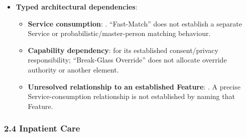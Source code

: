 \begin{itemize}
\begin{itemize}
\end{itemize}


\item 
\textbf{Typed architectural dependencies}:


\begin{itemize}

\item 
\textbf{Service consumption}: \texttt{}. “Fast-Match” does not establish a separate Service or probabilistic/\allowbreak{}master-person matching behaviour.



\item 
\textbf{Capability dependency}: \texttt{} for its established consent/\allowbreak{}privacy responsibility; “Break-Glass Override” does not allocate override authority or another element.



\item 
\textbf{Unresolved relationship to an established Feature}: \texttt{}. A precise Service-consumption relationship is not established by naming that Feature.



\end{itemize}


\end{itemize}
\label{rad:sd:105}

\par\smallskip
{}\label{rad:sd:107}



\label{rad:sd:109}
\subsubsection*{2.4 Inpatient Care}
\label{rad:sd:110}

